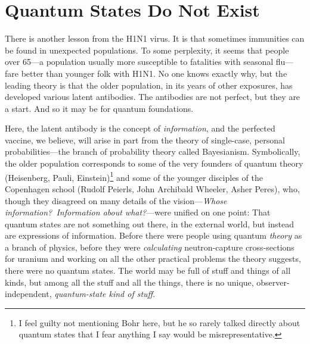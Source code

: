
\section{Quantum States Do Not Exist}

There is another lesson from the H1N1 virus.  It is that sometimes immunities can be found in unexpected populations.  To some perplexity, it seems that people over 65---a population usually more susceptible to fatalities with seasonal flu---fare better than younger folk with H1N1.  No one knows exactly why, but the leading theory is that the older population, in its years of other exposures, has developed various latent antibodies.  The antibodies are not perfect, but they are a start.  And so it may be for quantum foundations.

Here, the latent antibody is the concept of {\it information}, and the perfected vaccine, we believe, will arise in part from the theory of single-case, personal probabilities---the branch of probability theory called Bayesianism.  Symbolically, the older population corresponds to some of the very founders of quantum theory (Heisenberg, Pauli, Einstein)\footnote{I feel guilty not mentioning Bohr here, but he so rarely talked directly about quantum states that I fear anything I say would be misrepresentative.\label{FiddleFotts}} and some of the younger disciples of the Copenhagen school (Rudolf Peierls, John Archibald Wheeler, Asher Peres), who, though they disagreed on many details of the vision---{\it Whose information?\ Information about what?}---were unified on one point:  That quantum states are not something out there, in the external world, but instead are expressions of information.  Before there were people using quantum {\it theory\/} as a branch of physics, before they were {\it calculating\/} neutron-capture cross-sections for uranium and working on all the other practical problems the theory suggests, there were no quantum states.  The world may be full of stuff and things of all kinds, but among all the stuff and all the things, there is no unique, observer-independent, {\it quantum-state kind of stuff}.

